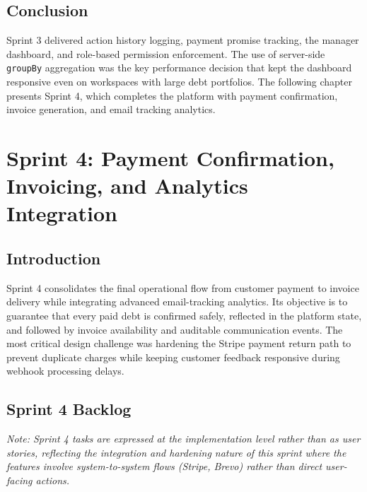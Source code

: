 \documentclass[12pt,a4paper]{report}
\begin{document}
\section*{Conclusion}
{}

Sprint 3 delivered action history logging, payment promise tracking, the manager
dashboard, and role-based permission enforcement.
The use of server-side \texttt{groupBy} aggregation was the key performance decision
that kept the dashboard responsive even on workspaces with large debt portfolios.
The following chapter presents Sprint 4, which completes the platform with payment
confirmation, invoice generation, and email tracking analytics.

\clearpage
\chapter{Sprint 4: Payment Confirmation, Invoicing, and Analytics Integration}
\label{chap:sprint4}

\section*{Introduction}
{}

Sprint 4 consolidates the final operational flow from customer payment to invoice
delivery while integrating advanced email-tracking analytics.
Its objective is to guarantee that every paid debt is confirmed safely, reflected in
the platform state, and followed by invoice availability and auditable communication
events.
The most critical design challenge was hardening the Stripe payment return path to
prevent duplicate charges while keeping customer feedback responsive during webhook
processing delays.

\section{Sprint 4 Backlog}

\noindent\textit{Note: Sprint 4 tasks are expressed at the implementation level
rather than as user stories, reflecting the integration and hardening nature of
this sprint where the features involve system-to-system flows (Stripe, Brevo)
rather than direct user-facing actions.}
\end{document}
